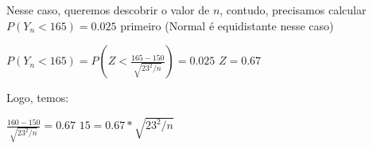 \documentclass{article}
\begin{document}
    Nesse caso, queremos descobrir o valor de $n$, contudo, precisamos calcular $P (Y_n < 165) = 0.025$ primeiro (Normal é equidistante nesse caso) \\
    
    \begin{center}
    	$P(Y_n < 165) = P (Z < \frac{165 - 150}{\sqrt{23^2 / n}}) = 0.025$
    	$Z = 0.67$
    \end{center}
    
    Logo, temos:
    
    \begin{center}
    	$\frac{160 - 150}{\sqrt{23^2 / n}} = 0.67$
    	$15 = 0.67 * \sqrt{23^2 / n}$
    \end{center}
\end{document}
